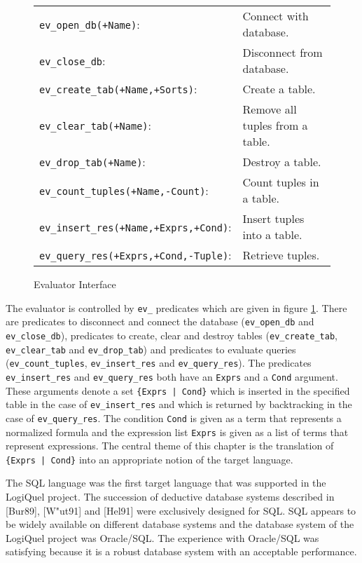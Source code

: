 \begin{figure}
\begin{center}
\begin{tabular}{ll}
\verb.ev_open_db(+Name).: & Connect with database. \\
\verb.ev_close_db.: & Disconnect from database. \\
\verb.ev_create_tab(+Name,+Sorts).: & Create a table. \\
\verb.ev_clear_tab(+Name).: & Remove all tuples from a table. \\
\verb.ev_drop_tab(+Name).: & Destroy a table.\\
\verb.ev_count_tuples(+Name,-Count).: & Count tuples in a table. \\
\verb.ev_insert_res(+Name,+Exprs,+Cond).: & Insert tuples into a table. \\
\verb.ev_query_res(+Exprs,+Cond,-Tuple).: & Retrieve tuples.
\end{tabular}
\end{center}
\caption{Evaluator Interface}
\label{figeval}
\end{figure}

The evaluator is controlled by \verb.ev_. predicates which are given in figure \ref{figeval}.
There are predicates to disconnect and connect the database (\verb.ev_open_db. and
\verb.ev_close_db.), predicates to create, clear and destroy tables (\verb.ev_create_tab.,
\verb.ev_clear_tab. and \verb.ev_drop_tab.) and predicates to evaluate queries 
(\verb.ev_count_tuples., \verb.ev_insert_res. and \verb.ev_query_res.). The predicates 
\verb.ev_insert_res. and \verb.ev_query_res. both have an \verb.Exprs. and a \verb.Cond. 
argument. These arguments denote a set \verb.{Exprs | Cond}. which is inserted in the 
specified table in the case of \verb.ev_insert_res. and which is returned by backtracking 
in the case of \verb.ev_query_res.. The condition \verb.Cond. is given as a term that 
represents a normalized formula and the expression list \verb.Exprs. is given as a list of
terms that represent expressions. The central theme of this chapter is the translation of
\verb.{Exprs | Cond}. into an appropriate notion of the target language.

\label{secsql}
The SQL language was the first target language that was supported in the LogiQuel project. The 
succession of deductive database systems described in [Bur89], [W"ut91] and [Hel91] were 
exclusively designed for SQL. SQL appears to be widely available on different database systems 
and the database system of the LogiQuel project was Oracle/SQL. The experience with Oracle/SQL was 
satisfying because it is a robust database system with an acceptable performance.

